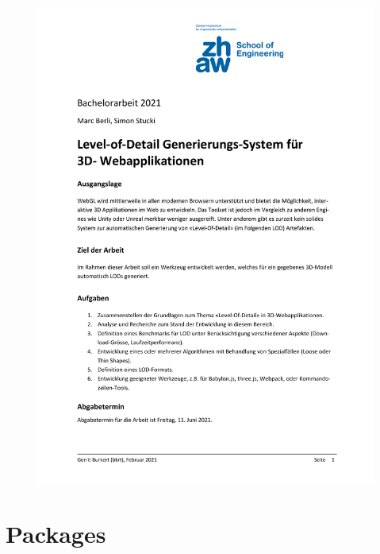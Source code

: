 \begin{figure}[H]
  \centering
\includegraphics[page=2,scale=0.55]{../ressources/Aufgabenstellung.pdf}
\end{figure}


\section{Packages}






